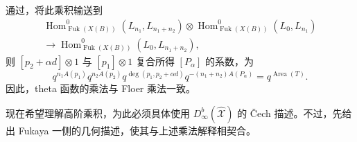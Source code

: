 通过，将此乘积输送到
\[
\begin{aligned}
\operatorname{Hom}_{\operatorname{Fuk}(X(B))}^0(L_{n_1},L_{n_1+n_2})
\otimes\operatorname{Hom}_{\operatorname{Fuk}(X(B))}^0(L_0,L_{n_1})\\
\longrightarrow\operatorname{Hom}_{\operatorname{Fuk}(X(B))}^0(L_0,L_{n_1+n_2}),
\end{aligned}
\]
则 $[p_2+\alpha d]\otimes1$ 与 $[p_1]\otimes1$ 复合所得 $[P_\alpha]$ 的系数，为
\[
q^{n_1A(p_1)}q^{n_2A(p_2)}q^{\deg(p_1,p_2+\alpha d)}
q^{-(n_1+n_2)A(P_\alpha)}=q^{\operatorname{Area}(T)}.
\]
因此，theta 函数的乘法与 Floer 乘法一致。

现在希望理解高阶乘积，为此必须具体使用 $D^b_\infty(\widehat{\mathcal X})$ 的 Čech 描述。不过，先给出 Fukaya 一侧的几何描述，使其与上述乘法解释相契合。
